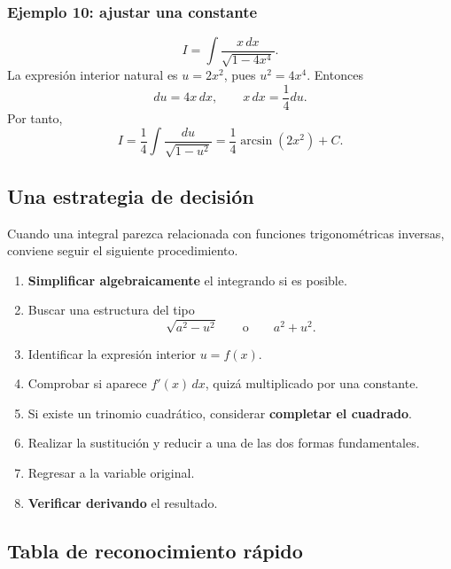 \documentclass[12pt]{article}
\theoremstyle{definition}
\theoremstyle{remark}
\begin{document}
\subsubsection*{Ejemplo 10: ajustar una constante}
\[
I=\int\frac{x\,dx}{\sqrt{1-4x^4}}.
\]
La expresión interior natural es $u=2x^2$, pues $u^2=4x^4$. Entonces
\[
du=4x\,dx,
\qquad x\,dx=\frac14du.
\]
Por tanto,
\[
I=\frac14\int\frac{du}{\sqrt{1-u^2}}
=\boxed{\frac14\arcsin(2x^2)+C}.
\]

\subsection{Una estrategia de decisión}

Cuando una integral parezca relacionada con funciones trigonométricas
inversas, conviene seguir el siguiente procedimiento.

\begin{enumerate}
\item \textbf{Simplificar algebraicamente} el integrando si es posible.
\item Buscar una estructura del tipo
\[
\sqrt{a^2-u^2}
\qquad\text{o}\qquad
a^2+u^2.
\]
\item Identificar la expresión interior $u=f(x)$.
\item Comprobar si aparece $f'(x)\,dx$, quizá multiplicado por una constante.
\item Si existe un trinomio cuadrático, considerar \textbf{completar el cuadrado}.
\item Realizar la sustitución y reducir a una de las dos formas fundamentales.
\item Regresar a la variable original.
\item \textbf{Verificar derivando} el resultado.
\end{enumerate}

\subsection{Tabla de reconocimiento rápido}
\end{document}
